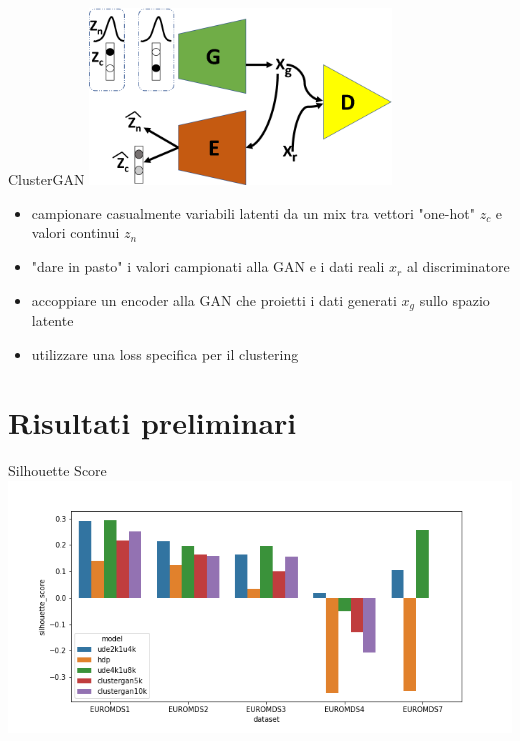 \documentclass{beamer}
\begin{document}
\begin{frame}{ClusterGAN}
	\centering
	\includegraphics[width=0.6\textwidth, keepaspectratio]{./images/ClusterGAN_model.png}
	\begin{itemize}
		\item campionare casualmente variabili latenti da un mix tra vettori "one-hot" $z_c$ e valori continui $z_n$
		\item "dare in pasto" i valori campionati alla GAN e i dati reali $x_r$ al discriminatore
		\item accoppiare un encoder alla GAN che proietti i dati generati $x_g$ sullo spazio latente
		\item utilizzare una loss specifica per il clustering
	\end{itemize}
\end{frame}

\section{Risultati preliminari}

\begin{frame}{Silhouette Score}
	\centering
	\includegraphics[width=\textwidth, keepaspectratio]{./images/silh_score.png}
\end{frame}
\end{document}
